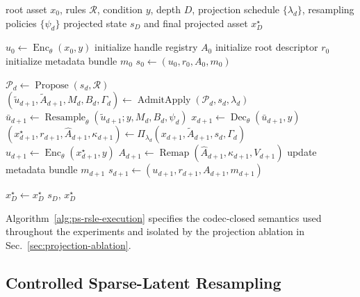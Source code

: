 \documentclass[acmtog,anonymous,review]{acmart}
\begin{document}
\begin{algorithm}[t]
  \caption{Formal codec-closed PS-RSLE transition with per-depth projection.}
  \label{alg:ps-rsle-execution}
  \begin{algorithmic}[1]
    \Require root asset $x_0$, rules $\mathcal R$, condition $y$, depth $D$, projection schedule $\{\lambda_d\}$, resampling policies $\{\psi_d\}$
    \Ensure projected state $s_D$ and final projected asset $x_D^\star$

    \State $u_0 \gets \operatorname{Enc}_\theta(x_0,y)$
    \State initialize handle registry $A_0$
    \State initialize root descriptor $r_0$
    \State initialize metadata bundle $m_0$
    \State $s_0\gets(u_0,r_0,A_0,m_0)$

      \State $\mathcal P_d \gets \operatorname{Propose}(s_d,\mathcal R)$
      \State $(\widetilde u_{d+1},\widetilde A_{d+1},M_d,B_d,\Gamma_d)
      \gets \operatorname{AdmitApply}(\mathcal P_d,s_d,\lambda_d)$
      \State $\bar u_{d+1}
      \gets \operatorname{Resample}_\theta(\widetilde u_{d+1};y,M_d,B_d,\psi_d)$
      \State $x_{d+1}\gets \operatorname{Dec}_\theta(\bar u_{d+1},y)$
      \State $(x^\star_{d+1},r_{d+1},\widehat A_{d+1},\kappa_{d+1})
      \gets \Pi_{\lambda_d}(x_{d+1},\widetilde A_{d+1},s_d,\Gamma_d)$
      \State $u_{d+1}\gets \operatorname{Enc}_\theta(x^\star_{d+1},y)$
      \State $A_{d+1}\gets \operatorname{Remap}(\widehat A_{d+1},\kappa_{d+1},V_{d+1})$
      \State update metadata bundle $m_{d+1}$
      \State $s_{d+1}\gets(u_{d+1},r_{d+1},A_{d+1},m_{d+1})$
    \EndFor

    \State $x_D^\star\gets x^\star_D$
    \State \Return $s_D$, $x_D^\star$
  \end{algorithmic}
\end{algorithm}

Algorithm~\ref{alg:ps-rsle-execution} specifies the codec-closed semantics used throughout the experiments and isolated by the projection ablation in Sec.~\ref{sec:projection-ablation}.

\subsection{Controlled Sparse-Latent Resampling}
\label{sec:controlled-resampling}
\end{document}
